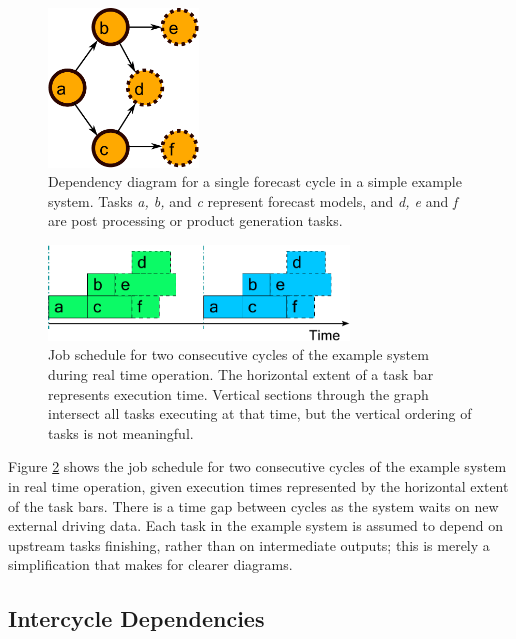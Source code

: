 \documentclass[11pt,a4paper]{article}
\begin{document}
\begin{figure} 
    \begin{center}
    \includegraphics[width=4cm]{dependencies-one} 
    \end{center}
    \caption{\small Dependency diagram for a single forecast cycle in a
    simple example system. Tasks {\em a, b,} and {\em c} represent
    forecast models, and {\em d, e} and {\em f} are post processing or
    product generation tasks.} 
    \label{fig-dep-one} 
\end{figure} 

\begin{figure}
    \begin{center}
        \includegraphics[width=8cm]{timeline-one}
    \end{center}
    \caption{\small Job schedule for two consecutive cycles of
the example system during real time operation. The horizontal extent of
a task bar represents execution time. Vertical sections through the
graph intersect all tasks executing at that time, but the vertical
ordering of tasks is not meaningful.}
    \label{fig-time-one}
\end{figure}

Figure \ref{fig-time-one} shows the job schedule for two consecutive
cycles of the example system in real time operation, given execution
times represented by the horizontal extent of the task bars. There is a
time gap between cycles as the system waits on new external driving
data.  Each task in the example system is assumed to depend on upstream
tasks finishing, rather than on intermediate outputs; this is merely 
a simplification that makes for clearer diagrams.

\subsection{Intercycle Dependencies}
\end{document}
